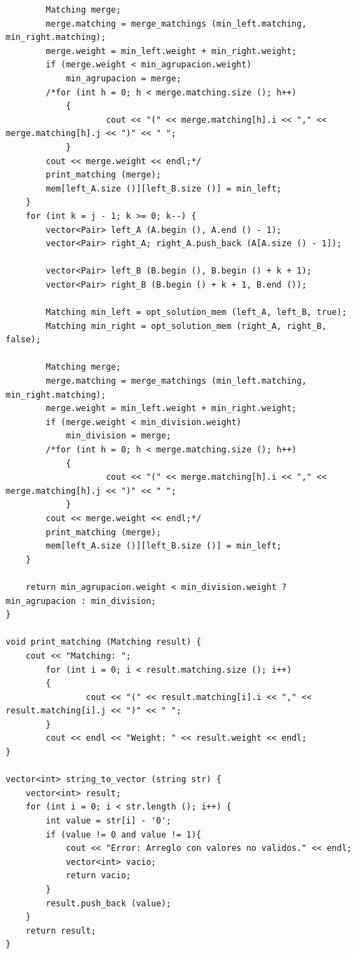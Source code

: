 \documentclass{article}
\begin{document}
\begin{lstlisting}
        Matching merge;
        merge.matching = merge_matchings (min_left.matching, min_right.matching);
        merge.weight = min_left.weight + min_right.weight;
        if (merge.weight < min_agrupacion.weight)
            min_agrupacion = merge;
        /*for (int h = 0; h < merge.matching.size (); h++)
            {
                    cout << "(" << merge.matching[h].i << "," << merge.matching[h].j << ")" << " ";
            }
        cout << merge.weight << endl;*/
        print_matching (merge);
        mem[left_A.size ()][left_B.size ()] = min_left;
    }
    for (int k = j - 1; k >= 0; k--) {
        vector<Pair> left_A (A.begin (), A.end () - 1);
        vector<Pair> right_A; right_A.push_back (A[A.size () - 1]);

        vector<Pair> left_B (B.begin (), B.begin () + k + 1);
        vector<Pair> right_B (B.begin () + k + 1, B.end ());

        Matching min_left = opt_solution_mem (left_A, left_B, true);
        Matching min_right = opt_solution_mem (right_A, right_B, false);

        Matching merge;
        merge.matching = merge_matchings (min_left.matching, min_right.matching);
        merge.weight = min_left.weight + min_right.weight;
        if (merge.weight < min_division.weight)
            min_division = merge;
        /*for (int h = 0; h < merge.matching.size (); h++)
            {
                    cout << "(" << merge.matching[h].i << "," << merge.matching[h].j << ")" << " ";
            }
        cout << merge.weight << endl;*/
        print_matching (merge);
        mem[left_A.size ()][left_B.size ()] = min_left;
    }

    return min_agrupacion.weight < min_division.weight ? min_agrupacion : min_division;
}

void print_matching (Matching result) {
    cout << "Matching: ";
        for (int i = 0; i < result.matching.size (); i++)
        {
                cout << "(" << result.matching[i].i << "," << result.matching[i].j << ")" << " ";
        }
        cout << endl << "Weight: " << result.weight << endl;
}

vector<int> string_to_vector (string str) {
    vector<int> result;
    for (int i = 0; i < str.length (); i++) {
        int value = str[i] - '0';
        if (value != 0 and value != 1){
            cout << "Error: Arreglo con valores no validos." << endl;
            vector<int> vacio;
            return vacio;
        }
        result.push_back (value);
    }
    return result;
}


\end{lstlisting}
\end{document}
